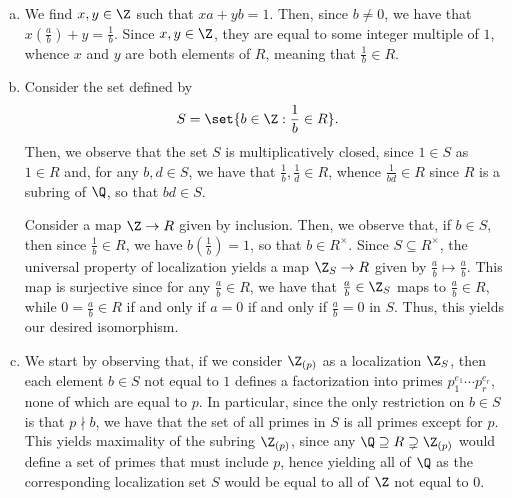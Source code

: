 \documentclass[10pt]{mypackage}
\begin{document}
\begin{solution}\hfill
  \begin{enumerate}[(a)]
    \item We find $x,y\in \Z$ such that $xa + yb = 1$. Then, since $b\neq 0$, we have that $x\left( \frac{a}{b} \right) + y = \frac{1}{b}$. Since $x,y\in \Z$, they are equal to some integer multiple of $1$, whence $x$ and $y$ are both elements of $R$, meaning that $\frac{1}{b}\in R$.
    \item Consider the set defined by
      \begin{align*}
        S &= \set{b\in \Z : \frac{1}{b}\in R}.
      \end{align*}
      Then, we observe that the set $S$ is multiplicatively closed, since $1\in S$ as $1\in R$ and, for any $b,d\in S$, we have that $\frac{1}{b},\frac{1}{d}\in R$, whence $\frac{1}{bd}\in R$ since $R$ is a subring of $\Q$, so that $bd\in S$.

      Consider a map $\Z\rightarrow R$ given by inclusion. Then, we observe that, if $b\in S$, then since $\frac{1}{b}\in R$, we have $b\left( \frac{1}{b} \right) = 1$, so that $b\in R^{\times}$. Since $S\subseteq R^{\times}$, the universal property of localization yields a map $\Z_{S}\rightarrow R$ given by $\frac{a}{b}\mapsto \frac{a}{b}$. This map is surjective since for any $\frac{a}{b}\in R$, we have that $\frac{a}{b}\in \Z_{S}$ maps to $\frac{a}{b}\in R$, while $0 = \frac{a}{b}\in R$ if and only if $a = 0$ if and only if $\frac{a}{b} = 0$ in $S$. Thus, this yields our desired isomorphism.
    \item We start by observing that, if we consider $\Z_{(p)}$ as a localization $\Z_S$, then each element $b\in S$ not equal to $1$ defines a factorization into primes $p_1^{e_1}\cdots p_r^{e_r}$, none of which are equal to $p$. In particular, since the only restriction on $b\in S$ is that $p\nmid b$, we have that the set of all primes in $S$ is all primes except for $p$. This yields maximality of the subring $\Z_{(p)}$, since any $\Q\supseteq R \supsetneq \Z_{(p)}$ would define a set of primes that must include $p$, hence yielding all of $\Q$ as the corresponding localization set $S$ would be equal to all of $\Z$ not equal to $0$.


\end{enumerate}
\end{solution}
\end{document}
